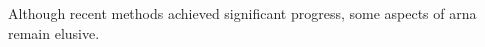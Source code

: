 

Although recent methods achieved significant progress, some aspects of \gls{arna} remain elusive.
